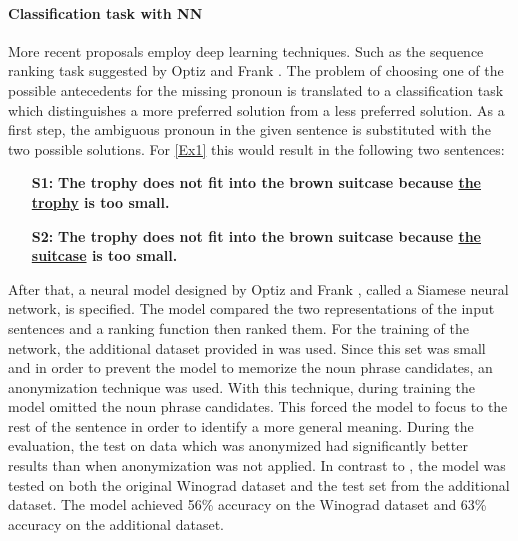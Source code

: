 \paragraph{Classification task with NN}
More recent proposals employ deep learning techniques. Such as the sequence ranking task suggested by Optiz and Frank \cite{W18-4105}. The problem of choosing one of the possible antecedents for the missing pronoun is translated to a classification task which distinguishes a more preferred solution from a less preferred solution. As a first step, the ambiguous pronoun in the given sentence is substituted with the two possible solutions.  
For \ref{Ex1} this would result in the following two sentences: 

\begin{itemize}
	\item [\textbf{S1:}] \textbf{The trophy does not fit into the brown suitcase because \underline{the trophy} is too small.}
	\item[\textbf{S2:}] \textbf{The trophy does not fit into the brown suitcase because \underline{the suitcase} is too small.}
\end{itemize} 

After that, a neural model designed by Optiz and Frank \cite{W18-4105}, called a Siamese neural network, is specified. The model compared the two representations of the input sentences and a ranking function then ranked them. 
For the training of the network, the additional dataset provided in \cite{DBLP:conf/emnlp/RahmanN12} was used. Since this set was small and in order to prevent the model to memorize the noun phrase candidates, an anonymization technique was used. With this technique, during training the model omitted the noun phrase candidates. This forced the model to focus to the rest of the sentence in order to identify a more general meaning. During the evaluation, the test on data which was anonymized had significantly better results than when anonymization was not applied. In contrast to \cite{DBLP:conf/emnlp/RahmanN12}, the model was tested on both the original Winograd dataset and the test set from the additional dataset. The model achieved 56\% accuracy on the Winograd dataset and 63\% accuracy on the additional dataset.

